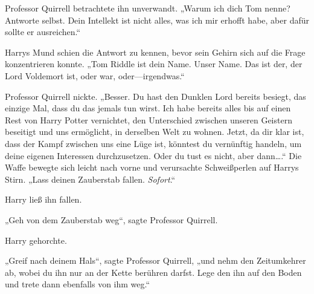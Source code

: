 Professor Quirrell betrachtete ihn unverwandt.
„Warum ich dich Tom nenne? Antworte selbst. Dein Intellekt ist nicht alles, was ich mir erhofft habe, aber dafür sollte er ausreichen.“

Harrys Mund schien die Antwort zu kennen, bevor sein Gehirn sich auf die Frage konzentrieren konnte.
„Tom Riddle ist dein Name. Unser Name. Das ist der, der Lord Voldemort ist, oder war, oder—irgendwas.“

Professor Quirrell nickte.
„Besser. Du hast den Dunklen Lord bereits besiegt, das einzige Mal, dass du das jemals tun wirst. Ich habe bereits alles bis auf einen Rest von Harry Potter vernichtet, den Unterschied zwischen unseren Geistern beseitigt und uns ermöglicht, in derselben Welt zu wohnen. Jetzt, da dir klar ist, dass der Kampf zwischen uns eine Lüge ist, könntest du vernünftig handeln, um deine eigenen Interessen durchzusetzen. Oder du tust es nicht, aber dann….“
Die Waffe bewegte sich leicht nach vorne und verursachte Schweißperlen auf Harrys Stirn.
„Lass deinen Zauberstab fallen. \emph{Sofort}.“

Harry ließ ihn fallen.

„Geh von dem Zauberstab weg“, sagte Professor Quirrell.

Harry gehorchte.

„Greif nach deinem Hals“, sagte Professor Quirrell, „und nehm den Zeitumkehrer ab, wobei du ihn nur an der Kette berühren darfst. Lege den ihn auf den Boden und trete dann ebenfalls von ihm weg.“

